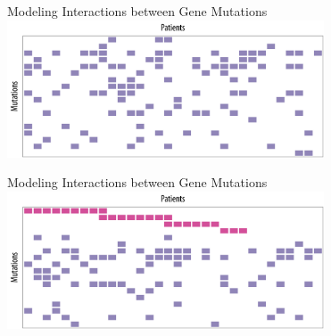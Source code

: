 \documentclass[mathserif]{beamer}
\begin{document}
\begin{frame}{Modeling Interactions between Gene Mutations}
\centering
\includegraphics[width=3.7in]{figures/example1.pdf}
\end{frame}

\begin{frame}{Modeling Interactions between Gene Mutations}
\centering
\includegraphics[width=3.7in]{figures/example1_rep.pdf}
\end{frame}
\end{document}
